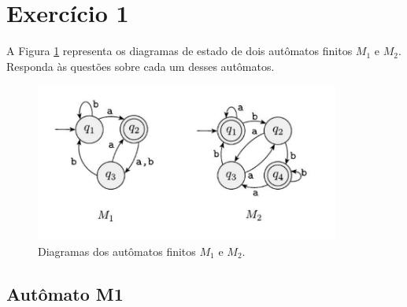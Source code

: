 \documentclass[a4paper, 12pt]{article}
\begin{document}
\newpage
\tableofcontents
\thispagestyle{empty}

\newpage
{}

\newpage
\section{Exercício 1}

A Figura \ref{fig:m1_m2} representa os diagramas de estado de dois autômatos 
finitos $M_1$ e $M_2$. Responda às questões sobre cada um desses autômatos.

\begin{figure}[!ht]
    \centering
    \includegraphics[width=10cm]{./imgs/img1.png}
    \caption{Diagramas dos autômatos finitos $M_1$ e $M_2$.}
    \label{fig:m1_m2}
\end{figure}

\subsection{Autômato M1}
\end{document}
